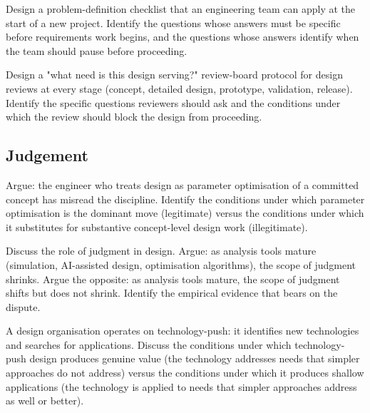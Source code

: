 \begin{exercise}
Design a problem-definition checklist that an engineering team can apply at the start of a new project. Identify the questions whose answers must be specific before requirements work begins, and the questions whose answers identify when the team should pause before proceeding.
\end{exercise}

\begin{exercise}
Design a "what need is this design serving?" review-board protocol for design reviews at every stage (concept, detailed design, prototype, validation, release). Identify the specific questions reviewers should ask and the conditions under which the review should block the design from proceeding.
\end{exercise}

\subsection*{Judgement}

\begin{exercise}
Argue: the engineer who treats design as parameter optimisation of a committed concept has misread the discipline. Identify the conditions under which parameter optimisation is the dominant move (legitimate) versus the conditions under which it substitutes for substantive concept-level design work (illegitimate).
\end{exercise}

\begin{exercise}
Discuss the role of judgment in design. Argue: as analysis tools mature (simulation, AI-assisted design, optimisation algorithms), the scope of judgment shrinks. Argue the opposite: as analysis tools mature, the scope of judgment shifts but does not shrink. Identify the empirical evidence that bears on the dispute.
\end{exercise}

\begin{exercise}
A design organisation operates on technology-push: it identifies new technologies and searches for applications. Discuss the conditions under which technology-push design produces genuine value (the technology addresses needs that simpler approaches do not address) versus the conditions under which it produces shallow applications (the technology is applied to needs that simpler approaches address as well or better).
\end{exercise}

